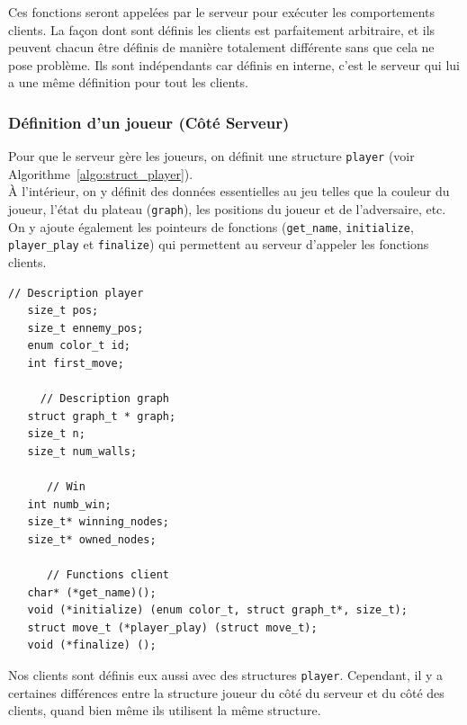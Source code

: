 \documentclass[a4paper]{article}
\begin{document}
Ces fonctions seront appelées par le serveur pour exécuter les comportements clients. La façon dont sont définis les clients est parfaitement arbitraire, et ils peuvent chacun être définis de manière totalement différente sans que cela ne pose problème. Ils sont indépendants car définis en interne, c'est le serveur qui lui a une même définition pour tout les clients.

\subsubsection{Définition d'un joueur (Côté Serveur)}
Pour que le serveur gère les joueurs, on définit une structure \texttt{player} (voir Algorithme~\ref{algo:struct_player}). \\

À l'intérieur, on y définit des données essentielles au jeu telles que la couleur du joueur, l'état du plateau (\texttt{graph}), les positions du joueur et de l'adversaire, etc. 
On y ajoute également les pointeurs de fonctions (\texttt{get\_name}, \texttt{initialize}, \texttt{player\_play} et \texttt{finalize}) qui permettent au serveur d'appeler les fonctions clients. \\

\begin{lstlisting}[caption = {Structure player}, label = {algo:struct_player}, float=ht!]
      // Description player
   size_t pos; 
   size_t ennemy_pos; 
   enum color_t id;
   int first_move; 

     // Description graph
   struct graph_t * graph;
   size_t n; 
   size_t num_walls;

      // Win
   int numb_win; 
   size_t* winning_nodes;
   size_t* owned_nodes; 
    
      // Functions client
   char* (*get_name)();
   void (*initialize) (enum color_t, struct graph_t*, size_t);
   struct move_t (*player_play) (struct move_t);
   void (*finalize) (); 
\end{lstlisting}

Nos clients sont définis eux aussi avec des structures \texttt{player}. Cependant, il y a certaines différences entre la structure joueur du côté du serveur et du côté des clients, quand bien même ils utilisent la même structure. \\
\end{document}
